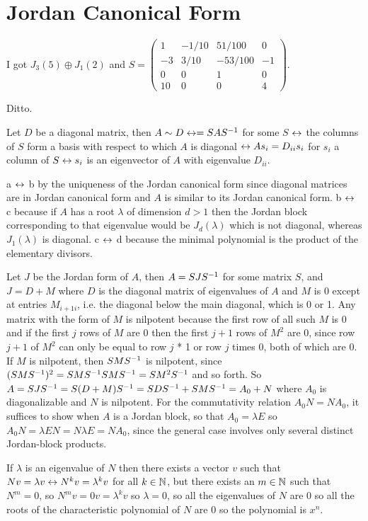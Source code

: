 \documentclass[11pt, oneside]{article}   	%
\begin{document}
\section{Jordan Canonical Form}
\be
\item I got $J_3(5) \oplus J_1(2)$ and $S=\left( \begin{array}{cccc} 1 & -1/10 &51/100 & 0 \\ -3 & 3/10 & -53/100 & -1 \\ 0 & 0 & 1 & 0 \\ 10 & 0 & 0 & 4 \end{array} \right).$
\item Ditto.
\item Let $D$ be a diagonal matrix, then $A \sim D \leftrightarrow  = SAS^{-1}$ for some $S$ $\leftrightarrow$ the columns of $S$ form a basis with respect to which $A$ is diagonal $\leftrightarrow As_i = D_{ii}s_i$ for $s_i$ a column of $S \leftrightarrow s_i$ is an eigenvector of $A$ with eigenvalue $D_{ii}$. 
\item a $\leftrightarrow$ b by the uniqueness of the Jordan canonical form since diagonal matrices are in Jordan canonical form and $A$ is similar to its Jordan canonical form. b $\leftrightarrow$ c because if $A$ has a root $\lambda$ of dimension $d > 1$ then the Jordan block corresponding to that eigenvalue would be $J_d(\lambda)$ which is not diagonal, whereas $J_1(\lambda)$ is diagonal. c $\leftrightarrow$ d because the minimal polynomial is the product of the elementary divisors.
\item Let $J$ be the Jordan form of $A$, then $A = SJS^{-1}$ for some matrix $S$, and $J = D + M$ where $D$ is the diagonal matrix of eigenvalues of $A$ and $M$ is 0 except at entries $M_{i+1i}$, i.e. the diagonal below the main diagonal, which is 0 or 1. Any matrix with the form of $M$ is nilpotent because the first row of all such $M$ is 0 and if the first $j$ rows of $M$ are 0 then the first $j+1$ rows of $M^2$ are 0, since row $j+1$ of $M^2$ can only be equal to row $j$ * 1 or row $j$ times 0, both of which are 0. If $M$ is nilpotent, then $SMS^{-1}$ is nilpotent, since $(SMS^{-1})^2 = SMS^{-1} SMS^{-1} = SM^2S^{-1}$ and so forth. So $A = SJS^{-1} = S(D + M)S^{-1} = SDS^{-1} + SMS^{-1} = A_0 + N$ where $A_0$ is diagonalizable and $N$ is nilpotent. For the commutativity relation $A_0N = NA_0$, it suffices to show when $A$ is a Jordan block, so that $A_0 = \lambda E$ so $A_0N = \lambda EN = N\lambda E = NA_0$, since the general case involves only several distinct Jordan-block products. 
\item \be
\item If $\lambda$ is an eigenvalue of $N$ then there exists a vector $v$ such that $Nv = \lambda v \leftrightarrow N^k v = \lambda^k v$ for all $k \in \mathbb{N}$, but there exists an $m \in \mathbb{N}$ such that $N^m = 0$, so $N^m v = 0v = \lambda^k v$ so $\lambda = 0$, so all the eigenvalues of $N$ are 0 so all the roots of the characteristic polynomial of $N$ are 0 so the polynomial is $x^n$. 
\end{document}
